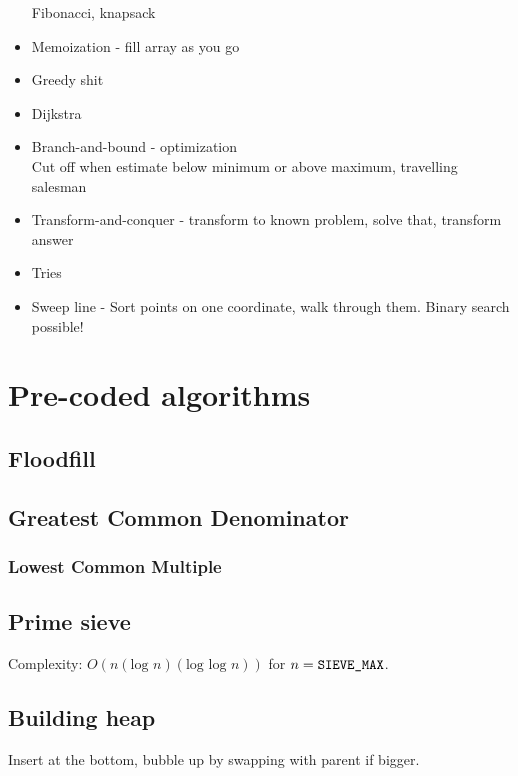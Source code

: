 \documentclass[10pt,hidelinks]{article}
\begin{document}
\begin{itemize}
	Fibonacci, knapsack
\item Memoization - fill array as you go
\item Greedy shit
\item Dijkstra
\item Branch-and-bound - optimization \\
	Cut off when estimate below minimum or above maximum, travelling salesman
\item Transform-and-conquer - transform to known problem, solve that, transform answer
\item Tries
\item Sweep line - Sort points on one coordinate, walk through them. Binary search possible!
\end{itemize}

\pagebreak

\section{Pre-coded algorithms}

\subsection{Floodfill}


\subsection{Greatest Common Denominator}


\subsubsection{Lowest Common Multiple}


\subsection{Prime sieve}
Complexity: $O(n(\text{log }n)(\text{log log }n))$ for $n = \text{\texttt{SIEVE\_MAX}}$.


\subsection{Building heap}
Insert at the bottom, bubble up by swapping with parent if bigger.
\end{document}
